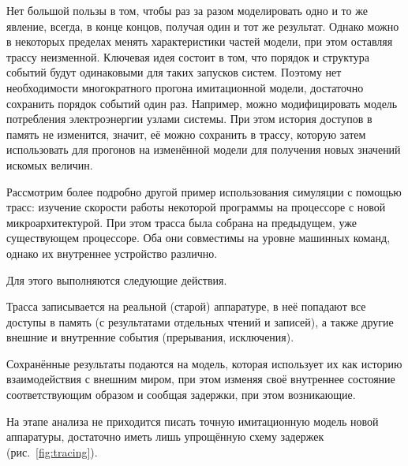Нет большой пользы в том, чтобы раз за разом моделировать одно и то же явление, всегда, в конце концов, получая один и тот же результат. Однако можно в некоторых пределах менять характеристики частей модели, при этом оставляя трассу неизменной. Ключевая идея состоит в том, что порядок и структура событий будут одинаковыми для таких запусков систем. Поэтому нет необходимости многократного прогона имитационной модели, достаточно сохранить порядок событий один раз. Например, можно модифицировать модель потребления электроэнергии узлами системы. При этом история доступов в память не изменится, значит, её можно сохранить в трассу, которую затем использовать для прогонов на изменённой модели для получения новых значений искомых величин.

Рассмотрим более подробно другой пример использования  симуляции с помощью трасс: изучение скорости работы некоторой программы на процессоре с новой микроархитектурой. При этом трасса была собрана на предыдущем, уже существующем процессоре. Оба они совместимы на уровне машинных команд, однако их внутреннее устройство различно. 

Для этого выполняются следующие действия.

\begin{enumerate*}
    \item Трасса записывается на реальной (старой) аппаратуре, в неё попадают все доступы в память (с результатами отдельных чтений и записей), а также другие внешние и внутренние события (прерывания, исключения). 
    \item Сохранённые результаты подаются на модель, которая использует их как историю взаимодействия с внешним миром, при этом изменяя своё внутреннее состояние соответствующим образом и сообщая задержки, при этом возникающие. 
    \item На этапе анализа не приходится писать точную имитационную модель новой аппаратуры, достаточно иметь лишь упрощённую схему задержек (рис.~\ref{fig:tracing}).
\end{enumerate*}

